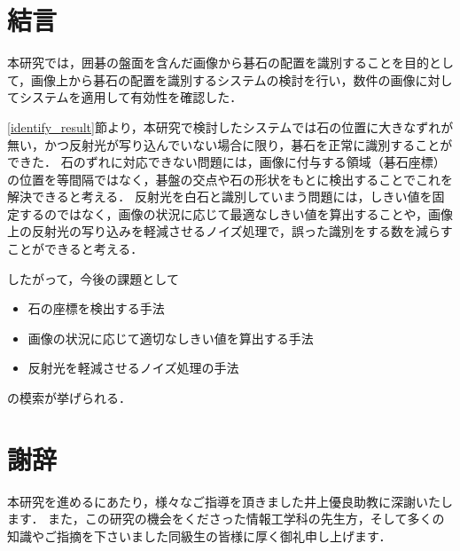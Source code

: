 \documentclass[openright]{nitocs}
\numberwithin{equation}{section}
\begin{document}
    \section{結言}\label{sec:Item} %
        本研究では，囲碁の盤面を含んだ画像から碁石の配置を識別することを目的として，画像上から碁石の配置を識別するシステムの検討を行い，数件の画像に対してシステムを適用して有効性を確認した．

        \ref{identify_result}節より，本研究で検討したシステムでは石の位置に大きなずれが無い，かつ反射光が写り込んでいない場合に限り，碁石を正常に識別することができた．
        石のずれに対応できない問題には，画像に付与する領域（碁石座標）の位置を等間隔ではなく，碁盤の交点や石の形状をもとに検出することでこれを解決できると考える．
        反射光を白石と識別していまう問題には，しきい値を固定するのではなく，画像の状況に応じて最適なしきい値を算出することや，画像上の反射光の写り込みを軽減させるノイズ処理で，誤った識別をする数を減らすことができると考える．

        したがって，今後の課題として
        \begin{itemize}
            \item 石の座標を検出する手法
            \item 画像の状況に応じて適切なしきい値を算出する手法
            \item 反射光を軽減させるノイズ処理の手法
        \end{itemize}
        の模索が挙げられる．

    \section*{謝辞} %
        本研究を進めるにあたり，様々なご指導を頂きました井上優良助教に深謝いたします．
        また，この研究の機会をくださった情報工学科の先生方，そして多くの知識やご指摘を下さいました同級生の皆様に厚く御礼申し上げます．
    
\end{document}
